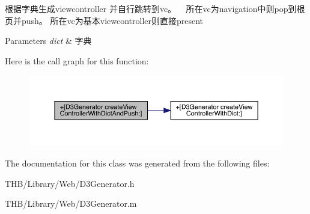 根据字典生成viewcontroller 并自行跳转到vc。 ~\newline
所在vc为navigation中则pop到根页并push。 所在vc为基本viewcontroller则直接present


\begin{DoxyParams}{Parameters}
{\em dict} & 字典 \\
\hline
\end{DoxyParams}
Here is the call graph for this function\+:\nopagebreak
\begin{figure}[H]
\begin{center}
\leavevmode
\includegraphics[width=350pt]{interface_d3_generator_a341215ec01f51ca7759029dec6b41dce_cgraph}
\end{center}
\end{figure}


The documentation for this class was generated from the following files\+:\begin{DoxyCompactItemize}
\item 
T\+H\+B/\+Library/\+Web/D3\+Generator.\+h\item 
T\+H\+B/\+Library/\+Web/D3\+Generator.\+m\end{DoxyCompactItemize}
